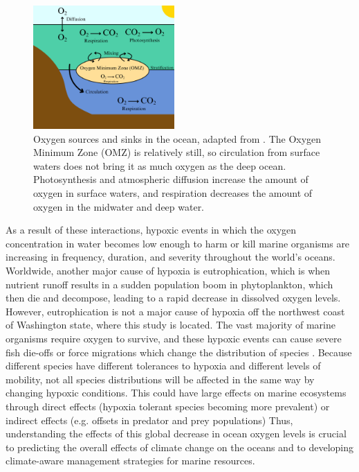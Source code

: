 \documentclass[12pt,twoside]{reedthesis}
\begin{document}
\begin{figure}
	\begin{center}
		\includegraphics[width=0.48\textwidth]{Fig_OMZ}
		\caption[Oxygen circulation]{\footnotesize{Oxygen sources and sinks in the ocean, adapted from \autocite{Deutsch2024}. The Oxygen Minimum Zone (OMZ) is relatively still, so circulation from surface waters does not bring it as much oxygen as the deep ocean. Photosynthesis and atmospheric diffusion increase the amount of oxygen in surface waters, and respiration decreases the amount of oxygen in the midwater and deep water.}}
		\label{OMZ}
	\end{center}
\end{figure} 

As a result of these interactions, hypoxic events in which the oxygen concentration in water becomes low enough to harm or kill marine organisms are increasing in frequency, duration, and severity throughout the world's oceans. Worldwide, another major cause of hypoxia is eutrophication, which is when nutrient runoff results in a sudden population boom in phytoplankton, which then die and decompose, leading to a rapid decrease in dissolved oxygen levels. However, eutrophication is not a major cause of hypoxia off the northwest coast of Washington state, where this study is located. The vast majority of marine organisms require oxygen to survive, and these hypoxic events can cause severe fish die-offs or force migrations which change the distribution of species \autocite{Pihl1991, Miller2002}. Because different species have different tolerances to hypoxia and different levels of mobility, not all species distributions will be affected in the same way by changing hypoxic conditions. This could have large effects on marine ecosystems through direct effects (hypoxia tolerant species becoming more prevalent) or indirect effects (e.g. offsets in predator and prey populations) Thus, understanding the effects of this global decrease in ocean oxygen levels is crucial to predicting the overall effects of climate change on the oceans and to developing climate-aware management strategies for marine resources. 
\end{document}
